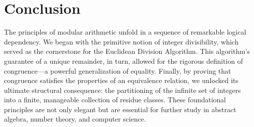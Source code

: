 \section*{Conclusion}
The principles of modular arithmetic unfold in a sequence of remarkable logical dependency. We began with the primitive notion of integer divisibility, which served as the cornerstone for the Euclidean Division Algorithm. This algorithm's guarantee of a unique remainder, in turn, allowed for the rigorous definition of congruence---a powerful generalization of equality. Finally, by proving that congruence satisfies the properties of an equivalence relation, we unlocked its ultimate structural consequence: the partitioning of the infinite set of integers into a finite, manageable collection of residue classes. These foundational principles are not only elegant but are essential for further study in abstract algebra, number theory, and computer science.